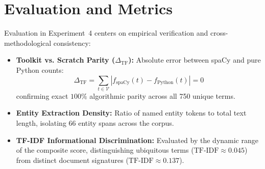 \documentclass[12pt,a4paper]{report}
\begin{document}
\section{Evaluation and Metrics}
Evaluation in Experiment~4 centers on empirical verification and cross-methodological consistency:
\begin{itemize}
    \item \textbf{Toolkit vs. Scratch Parity ($\Delta_{\text{TF}}$):} Absolute error between spaCy and pure Python counts:
    \begin{equation}
        \Delta_{\text{TF}} = \sum_{t \in \mathcal{V}} |f_{\text{spaCy}}(t) - f_{\text{Python}}(t)| = 0
    \end{equation}
    confirming exact $100\%$ algorithmic parity across all 750 unique terms.
    \item \textbf{Entity Extraction Density:} Ratio of named entity tokens to total text length, isolating 66 entity spans across the corpus.
    \item \textbf{TF-IDF Informational Discrimination:} Evaluated by the dynamic range of the composite score, distinguishing ubiquitous terms ($\text{TF-IDF} \approx 0.045$) from distinct document signatures ($\text{TF-IDF} \approx 0.137$).
\end{itemize}
\end{document}
